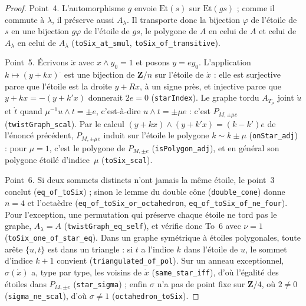 \begin{proof}
Point~4. L'automorphisme $g$ envoie $\mathrm{Et}(s)$ sur $\mathrm{Et}(gs)$ ; comme il commute à $\lambda$, il préserve aussi $A_\lambda$. Il transporte donc la bijection $\varphi$ de l'étoile de $s$ en une bijection $g\varphi$ de l'étoile de $gs$, le polygone de $A$ en celui de $A$ et celui de $A_\lambda$ en celui de $A_\lambda$ (\texttt{toSix\_at\_smul}, \texttt{toSix\_of\_transitive}).

Point~5. Écrivons $\dot x$ avec $x \wedge y_0 = 1$ et posons $y = ey_0$. L'application $k \mapsto (y + kx)^{\cdot}$ est une bijection de $\mathbf Z/n$ sur l'étoile de $\dot x$ : elle est surjective parce que l'étoile est la droite $y + Rx$, à un signe près, et injective parce que $y + kx = -(y + k'x)$ donnerait $2e = 0$ (\texttt{starIndex}). Le graphe tordu $A_{T_\mu}$ joint $\dot u$ et $\dot t$ quand $\mu^{-1}u \wedge t = \pm e$, c'est-à-dire $u \wedge t = \pm\mu e$ : c'est $P_{M, \pm\mu e}$ (\texttt{twistGraph\_scal}). Par le calcul $(y + kx) \wedge (y + k'x) = (k - k')e$ de l'énoncé précédent, $P_{M, \pm\mu e}$ induit sur l'étoile le polygone $k \sim k \pm \mu$ (\texttt{onStar\_adj}) : pour $\mu = 1$, c'est le polygone de $P_{M, \pm e}$ (\texttt{isPolygon\_adj}), et en général son polygone étoilé d'indice~$\mu$ (\texttt{toSix\_scal}).

Point~6. Si deux sommets distincts n'ont jamais la même étoile, le point~3 conclut (\texttt{eq\_of\_toSix}) ; sinon le lemme du double cône (\texttt{double\_cone}) donne $n = 4$ et l'octaèdre (\texttt{eq\_of\_toSix\_or\_octahedron}, \texttt{eq\_of\_toSix\_of\_ne\_four}). Pour l'exception, une permutation qui préserve chaque étoile ne tord pas le graphe, $A_\lambda = A$ (\texttt{twistGraph\_eq\_self}), et vérifie donc To~6 avec $\nu = 1$ (\texttt{toSix\_one\_of\_star\_eq}). Dans un graphe symétrique à étoiles polygonales, toute arête $\{u, t\}$ est dans un triangle : si $t$ a l'indice $k$ dans l'étoile de $u$, le sommet d'indice $k + 1$ convient (\texttt{triangulated\_of\_pol}). Sur un anneau exceptionnel, $\sigma(\dot x)$ a, type par type, les voisins de $\dot x$ (\texttt{same\_star\_iff}), d'où l'égalité des étoiles dans $P_{M, \pm e}$ (\texttt{star\_sigma}) ; enfin $\sigma$ n'a pas de point fixe sur $\mathbf Z/4$, où $2 \neq 0$ (\texttt{sigma\_ne\_scal}), d'où $\sigma \neq 1$ (\texttt{octahedron\_toSix}).
\end{proof}

